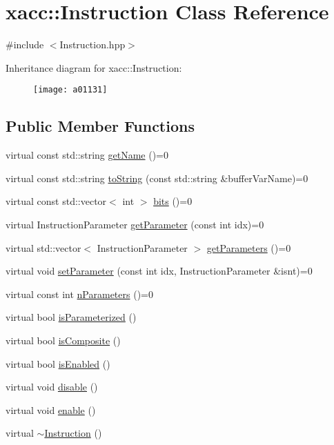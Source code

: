 \hypertarget{a01131}{}\section{xacc\+:\+:Instruction Class Reference}
\label{a01131}


{\ttfamily \#include $<$Instruction.\+hpp$>$}

Inheritance diagram for xacc\+:\+:Instruction\+:\begin{figure}[H]
\begin{center}
\leavevmode
\texttt{[image: a01131]}
\end{center}
\end{figure}
\subsection*{Public Member Functions}
\begin{DoxyCompactItemize}
\item 
virtual const std\+::string \hyperlink{a01131_ac7ff23f693e2276edbf3fdac5452792c}{get\+Name} ()=0
\item 
virtual const std\+::string \hyperlink{a01131_ae94c2d089908294c1d410b14c96817ae}{to\+String} (const std\+::string \&buffer\+Var\+Name)=0
\item 
virtual const std\+::vector$<$ int $>$ \hyperlink{a01131_a819f32e94c3e1c9e69a0061aaf8d86dc}{bits} ()=0
\item 
virtual Instruction\+Parameter \hyperlink{a01131_aa0d9de97a4833a042379647f83c33ab6}{get\+Parameter} (const int idx)=0
\item 
virtual std\+::vector$<$ Instruction\+Parameter $>$ \hyperlink{a01131_aeb67c67713896e8f27a5c7dd531f3340}{get\+Parameters} ()=0
\item 
virtual void \hyperlink{a01131_a407a0ac662fa0b1ec3e301e8ff9bade7}{set\+Parameter} (const int idx, Instruction\+Parameter \&isnt)=0
\item 
virtual const int \hyperlink{a01131_ad54585d13c04ffd20296fff7ab8107ff}{n\+Parameters} ()=0
\item 
virtual bool \hyperlink{a01131_a7b24d8ae485369fc2b2df7a3224a5e26}{is\+Parameterized} ()
\item 
virtual bool \hyperlink{a01131_a4383f1036d0fcfe890ab9c613dbd5f38}{is\+Composite} ()
\item 
virtual bool \hyperlink{a01131_ad02a1cf7220577124720b7a51424cea7}{is\+Enabled} ()
\item 
virtual void \hyperlink{a01131_a6e528da15e05a94cc1d7db268c483271}{disable} ()
\item 
virtual void \hyperlink{a01131_a0b4f2e5a591af28342a3c08e4305e24f}{enable} ()
\item 
virtual \hyperlink{a01131_ae22c935e8113bce63d1d0e214cda4d61}{$\sim$\+Instruction} ()
\end{DoxyCompactItemize}
